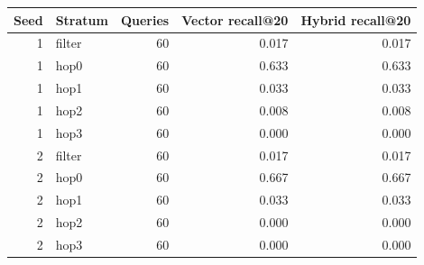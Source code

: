 \begin{tabular}{rlrrr}
\toprule
Seed & Stratum & Queries & Vector recall@20 & Hybrid recall@20 \\
\midrule
1 & filter & 60 & 0.017 & 0.017 \\
1 & hop0 & 60 & 0.633 & 0.633 \\
1 & hop1 & 60 & 0.033 & 0.033 \\
1 & hop2 & 60 & 0.008 & 0.008 \\
1 & hop3 & 60 & 0.000 & 0.000 \\
2 & filter & 60 & 0.017 & 0.017 \\
2 & hop0 & 60 & 0.667 & 0.667 \\
2 & hop1 & 60 & 0.033 & 0.033 \\
2 & hop2 & 60 & 0.000 & 0.000 \\
2 & hop3 & 60 & 0.000 & 0.000 \\
\bottomrule
\end{tabular}
